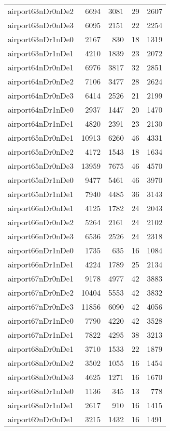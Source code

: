 \documentclass[../../../thesis.tex]{subfiles}
\begin{document}
\begin{longtable}{lrrrr}
airport63nDr0nDe2 & 6694 & 3081 & 29 & 2607 \\
airport63nDr0nDe3 & 6095 & 2151 & 22 & 2254 \\
airport63nDr1nDe0 & 2167 & 830 & 18 & 1319 \\
airport63nDr1nDe1 & 4210 & 1839 & 23 & 2072 \\
airport64nDr0nDe1 & 6976 & 3817 & 32 & 2851 \\
airport64nDr0nDe2 & 7106 & 3477 & 28 & 2624 \\
airport64nDr0nDe3 & 6414 & 2526 & 21 & 2199 \\
airport64nDr1nDe0 & 2937 & 1447 & 20 & 1470 \\
airport64nDr1nDe1 & 4820 & 2391 & 23 & 2130 \\
airport65nDr0nDe1 & 10913 & 6260 & 46 & 4331 \\
airport65nDr0nDe2 & 4172 & 1543 & 18 & 1634 \\
airport65nDr0nDe3 & 13959 & 7675 & 46 & 4570 \\
airport65nDr1nDe0 & 9477 & 5461 & 46 & 3970 \\
airport65nDr1nDe1 & 7940 & 4485 & 36 & 3143 \\
airport66nDr0nDe1 & 4125 & 1782 & 24 & 2043 \\
airport66nDr0nDe2 & 5264 & 2161 & 24 & 2102 \\
airport66nDr0nDe3 & 6536 & 2526 & 24 & 2318 \\
airport66nDr1nDe0 & 1735 & 635 & 16 & 1084 \\
airport66nDr1nDe1 & 4224 & 1789 & 25 & 2134 \\
airport67nDr0nDe1 & 9178 & 4977 & 42 & 3883 \\
airport67nDr0nDe2 & 10404 & 5553 & 42 & 3832 \\
airport67nDr0nDe3 & 11856 & 6090 & 42 & 4056 \\
airport67nDr1nDe0 & 7790 & 4220 & 42 & 3528 \\
airport67nDr1nDe1 & 7822 & 4295 & 38 & 3213 \\
airport68nDr0nDe1 & 3710 & 1533 & 22 & 1879 \\
airport68nDr0nDe2 & 3502 & 1055 & 16 & 1454 \\
airport68nDr0nDe3 & 4625 & 1271 & 16 & 1670 \\
airport68nDr1nDe0 & 1136 & 345 & 13 & 778 \\
airport68nDr1nDe1 & 2617 & 910 & 16 & 1415 \\
airport69nDr0nDe1 & 3215 & 1432 & 16 & 1491 \\

\end{longtable}
\end{document}
